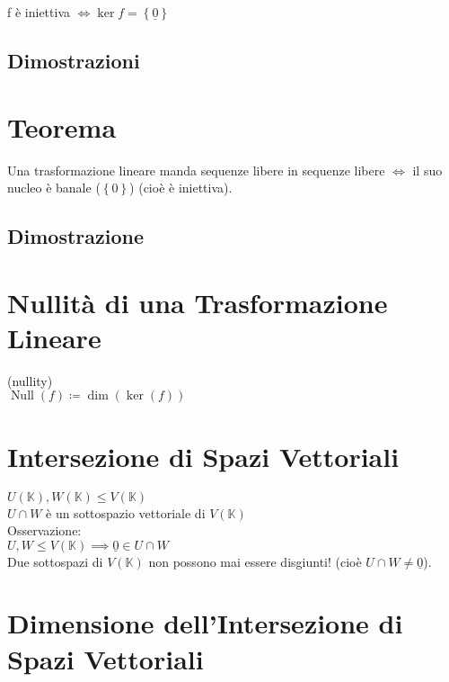 \documentclass[a4paper, twoside, italian, 11pt]{book}
\newcommand{\braces}[1] {\left \{ #1 \right \}}
\DeclareMathOperator{\Null}{Null}
\newcommand{\K}{\mathbb K}
\begin{document}
f è iniettiva $\iff \ker f = \braces{\underline 0}$


\subsection{Dimostrazioni}




\section{Teorema}

Una trasformazione lineare manda sequenze libere in sequenze libere $\iff$ il suo nucleo è banale ($\braces{0}$) (cioè è iniettiva).


\subsection{Dimostrazione}




\section{Nullità di una Trasformazione Lineare}

(nullity) \\

\noindent
$\Null(f) \coloneqq \dim(\ker(f))$



\section{Intersezione di Spazi Vettoriali}

$U(\K), W(\K) \leq V(\K)$ \\

\noindent
$U \cap W$ è un sottospazio vettoriale di $V(\K)$ \\

\noindent
Osservazione: \\

\noindent
$U, W \leq V(\K) \implies \underline 0 \in U \cap W$ \\
Due sottospazi di $V(\K)$ non possono mai essere disgiunti! (cioè $U \cap W \neq \underline 0$).



\section{Dimensione dell'Intersezione di Spazi Vettoriali}
\end{document}
